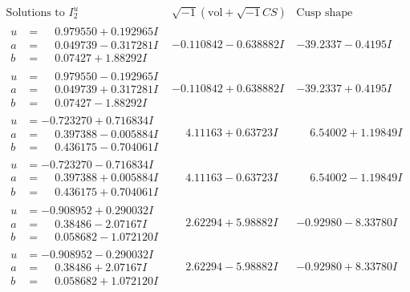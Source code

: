 \documentclass[1p]{elsarticle_modified}
\theoremstyle{definition}
\newcommand{\I}{\sqrt{-1}}
\begin{document}
$$\begin{array}{c|c|c}  
\text{Solutions to }I^u_{2}& \I (\text{vol} + \sqrt{-1}CS) & \text{Cusp shape}\\
 \hline 
\begin{aligned}
u &= \phantom{-}0.979550 + 0.192965 I \\
a &= \phantom{-}0.049739 - 0.317281 I \\
b &= \phantom{-}0.07427 + 1.88292 I\end{aligned}
 & -0.110842 - 0.638882 I & -39.2337 - 0.4195 I \\ \hline\begin{aligned}
u &= \phantom{-}0.979550 - 0.192965 I \\
a &= \phantom{-}0.049739 + 0.317281 I \\
b &= \phantom{-}0.07427 - 1.88292 I\end{aligned}
 & -0.110842 + 0.638882 I & -39.2337 + 0.4195 I \\ \hline\begin{aligned}
u &= -0.723270 + 0.716834 I \\
a &= \phantom{-}0.397388 - 0.005884 I \\
b &= \phantom{-}0.436175 - 0.704061 I\end{aligned}
 & \phantom{-}4.11163 + 0.63723 I & \phantom{-}6.54002 + 1.19849 I \\ \hline\begin{aligned}
u &= -0.723270 - 0.716834 I \\
a &= \phantom{-}0.397388 + 0.005884 I \\
b &= \phantom{-}0.436175 + 0.704061 I\end{aligned}
 & \phantom{-}4.11163 - 0.63723 I & \phantom{-}6.54002 - 1.19849 I \\ \hline\begin{aligned}
u &= -0.908952 + 0.290032 I \\
a &= \phantom{-}0.38486 - 2.07167 I \\
b &= \phantom{-}0.058682 - 1.072120 I\end{aligned}
 & \phantom{-}2.62294 + 5.98882 I & -0.92980 - 8.33780 I \\ \hline\begin{aligned}
u &= -0.908952 - 0.290032 I \\
a &= \phantom{-}0.38486 + 2.07167 I \\
b &= \phantom{-}0.058682 + 1.072120 I\end{aligned}
 & \phantom{-}2.62294 - 5.98882 I & -0.92980 + 8.33780 I \\ \hline\begin{aligned}

\end{aligned}
\end{array}$$
\end{document}
